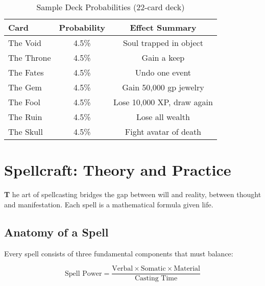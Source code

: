 \documentclass[11pt,letterpaper,openany]{book}
\newcommand{\firstletter}[1]{%
    \textcolor{bloodred}{\fontsize{48}{48}\selectfont\bfseries #1}%
}
\begin{document}
\begin{table}[h]
\centering
\small
\begin{tabular}{@{}lcc@{}}
\toprule
\textbf{Card} & \textbf{Probability} & \textbf{Effect Summary} \\
\midrule
The Void & 4.5\% & Soul trapped in object \\
The Throne & 4.5\% & Gain a keep \\
The Fates & 4.5\% & Undo one event \\
The Gem & 4.5\% & Gain 50,000 gp jewelry \\
The Fool & 4.5\% & Lose 10,000 XP, draw again \\
The Ruin & 4.5\% & Lose all wealth \\
The Skull & 4.5\% & Fight avatar of death \\
\bottomrule
\end{tabular}
\caption{Sample Deck Probabilities (22-card deck)}
\end{table}

\chapter{Spellcraft: Theory and Practice}

\firstletter{T}he art of spellcasting bridges the gap between will and reality, between thought and manifestation. Each spell is a mathematical formula given life.

\section{Anatomy of a Spell}

Every spell consists of three fundamental components that must balance:

\begin{equation}
\text{Spell Power} = \frac{\text{Verbal} \times \text{Somatic} \times \text{Material}}{\text{Casting Time}}
\end{equation}
\end{document}
